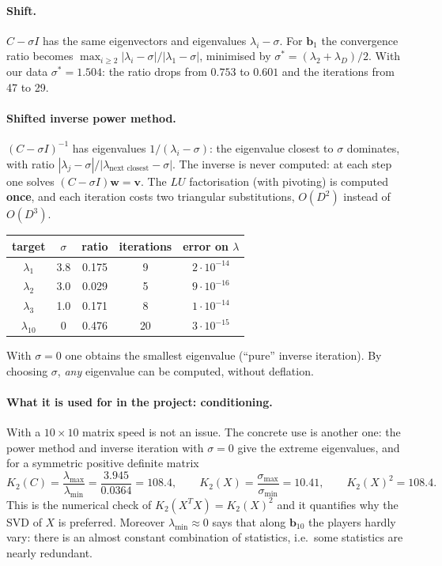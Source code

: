 \documentclass[11pt,a4paper]{article}
\theoremstyle{remark}
\newcommand{\bb}{\mathbf{b}}
\begin{document}
\paragraph{Shift.} $C-\sigma I$ has the same eigenvectors and eigenvalues $\lambda_i-\sigma$.
For $\bb_1$ the convergence ratio becomes $\max_{i\ge2}|\lambda_i-\sigma|/|\lambda_1-\sigma|$,
minimised by $\sigma^*=(\lambda_2+\lambda_D)/2$. With our data $\sigma^*=1.504$: the ratio drops
from $0.753$ to $0.601$ and the iterations from 47 to 29.

\paragraph{Shifted inverse power method.} $(C-\sigma I)^{-1}$ has eigenvalues $1/(\lambda_i-\sigma)$: the
eigenvalue closest to $\sigma$ dominates, with ratio
$|\lambda_j-\sigma|/|\lambda_{\text{next closest}}-\sigma|$. The inverse is never computed: at each step one solves
$(C-\sigma I)\mathbf w=\mathbf v$. The $LU$ factorisation (with pivoting) is computed \textbf{once},
and each iteration costs two triangular substitutions, $O(D^2)$ instead of $O(D^3)$.
\begin{center}
\begin{tabular}{ccccc}
\toprule
target & $\sigma$ & ratio & iterations & error on $\lambda$\\
\midrule
$\lambda_1$ & 3.8 & 0.175 & 9 & $2\cdot10^{-14}$\\
$\lambda_2$ & 3.0 & 0.029 & 5 & $9\cdot10^{-16}$\\
$\lambda_3$ & 1.0 & 0.171 & 8 & $1\cdot10^{-14}$\\
$\lambda_{10}$ & 0 & 0.476 & 20 & $3\cdot10^{-15}$\\
\bottomrule
\end{tabular}
\end{center}
With $\sigma=0$ one obtains the smallest eigenvalue (``pure'' inverse iteration).
By choosing $\sigma$, \emph{any} eigenvalue can be computed, without deflation.

\paragraph{What it is used for in the project: conditioning.}
With a $10\times10$ matrix speed is not an issue. The concrete use is another one:
the power method and inverse iteration with $\sigma=0$ give the extreme eigenvalues, and for a
symmetric positive definite matrix
\[
K_2(C)=\frac{\lambda_{\max}}{\lambda_{\min}}=\frac{3.945}{0.0364}=108.4,
\qquad
K_2(X)=\frac{\sigma_{\max}}{\sigma_{\min}}=10.41,\qquad K_2(X)^2=108.4 .
\]
This is the numerical check of $K_2(X^TX)=K_2(X)^2$ and it quantifies why the SVD of $X$ is preferred.
Moreover $\lambda_{\min}\approx 0$ says that along $\bb_{10}$ the players hardly vary: there is an almost
constant combination of statistics, i.e.\ some statistics are nearly redundant.
\end{document}
